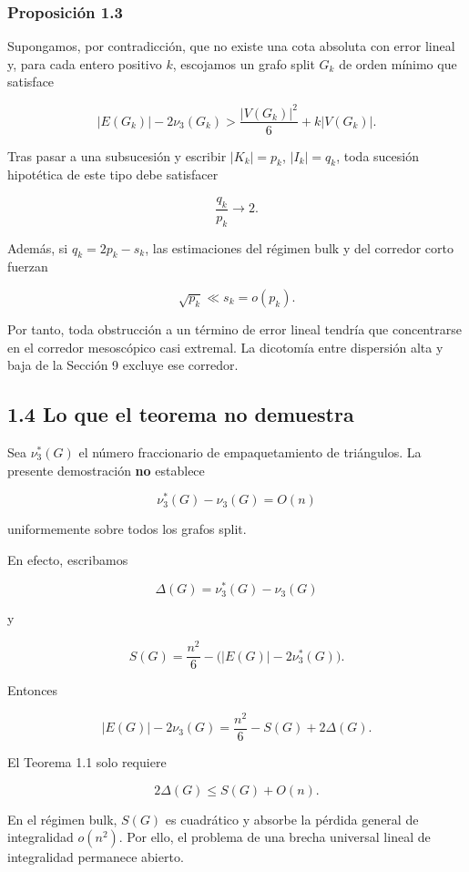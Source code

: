 \documentclass[
  11pt,
]{article}
\begin{document}
\subsubsection{Proposición 1.3}\label{proposiciuxf3n-1.3-localizaciuxf3n-de-obstrucciones-hipotuxe9ticas}

Supongamos, por contradicción, que no existe una cota absoluta con error
lineal y, para cada entero positivo \(k\), escojamos un grafo split
\(G_k\) de orden mínimo que satisface

\[
|E(G_k)|-2\nu_3(G_k)>\frac{|V(G_k)|^2}{6}+k|V(G_k)|.
\]

Tras pasar a una subsucesión y escribir \(|K_k|=p_k\), \(|I_k|=q_k\),
toda sucesión hipotética de este tipo debe satisfacer

\[
\frac{q_k}{p_k}\longrightarrow 2.
\]

Además, si \(q_k=2p_k-s_k\), las estimaciones del régimen bulk y del
corredor corto fuerzan

\[
\sqrt{p_k}\ll s_k=o(p_k).
\]

Por tanto, toda obstrucción a un término de error lineal tendría que
concentrarse en el corredor mesoscópico casi extremal. La dicotomía
entre dispersión alta y baja de la Sección 9 excluye ese corredor.

\subsection{1.4 Lo que el teorema no
demuestra}\label{lo-que-el-teorema-no-demuestra}

Sea \(\nu_3^*(G)\) el número fraccionario de empaquetamiento de
triángulos. La presente demostración \textbf{no} establece

\[
\nu_3^*(G)-\nu_3(G)=O(n)
\tag{1.4}
\]

uniformemente sobre todos los grafos split.

En efecto, escribamos

\[
\Delta(G)=\nu_3^*(G)-\nu_3(G)
\]

y

\[
S(G)=\frac{n^2}{6}-\bigl(|E(G)|-2\nu_3^*(G)\bigr).
\]

Entonces

\[
|E(G)|-2\nu_3(G)
=
\frac{n^2}{6}-S(G)+2\Delta(G).
\tag{1.5}
\]

El Teorema 1.1 solo requiere

\[
2\Delta(G)\le S(G)+O(n).
\]

En el régimen bulk, \(S(G)\) es cuadrático y absorbe la pérdida general
de integralidad \(o(n^2)\). Por ello, el problema de una brecha
universal lineal de integralidad permanece abierto.
\end{document}
